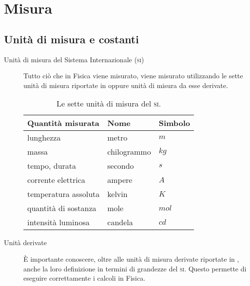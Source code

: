 \documentclass[a4paper,11pt,italian]{article}
\begin{document}
\section{Misura}

\subsection{Unità di misura e costanti}

\begin{description}
  \item[Unità di misura del Sistema Internazionale (\textsc{si})]
  Tutto ciò che in Fisica viene misurato, viene misurato utilizzando le sette unità di misura riportate in  oppure unità di misura da esse derivate.
  \begin{table}[htp]\centering
  \begin{tabular}{lll}\toprule
    \textbf{Quantità misurata} & \textbf{Nome} & \textbf{Simbolo} \\\midrule
    lunghezza & metro & $ m $ \\
    massa & chilogrammo & $ kg $ \\
    tempo, durata & secondo & $ s $ \\
    corrente elettrica  & ampere & $ A $ \\
    temperatura assoluta & kelvin & $ K $ \\
    quantità di sostanza & mole & $ mol $ \\
    intensità luminosa & candela & $ cd $ \\\bottomrule
  \end{tabular}
  \caption{Le sette unità di misura del \textsc{si}.}
  \label{tab:udmSI}
  \end{table}
 
 \item[Unità derivate]
 È importante conoscere, oltre alle unità di misura derivate riportate in , anche la loro definizione in termini di grandezze del \textsc{si}. Questo permette di eseguire correttamente i calcoli in Fisica.
 

\end{description}
\end{document}

